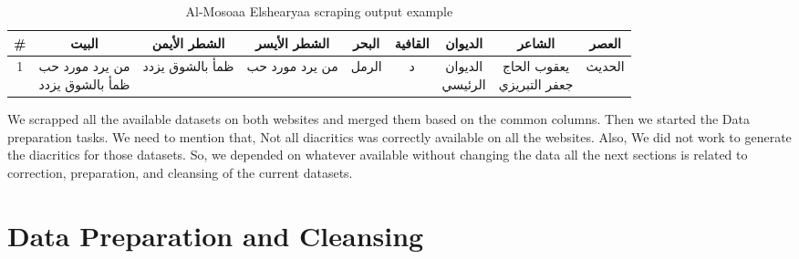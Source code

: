\begin{enumerate}
\begin{table}[H]
	\centering
	\begin{tabular}{c c c c c c c c c}
          \toprule
\small{\textbf{\#}} &
\small{\textbf{\textarabic{البيت}}} &
\small{\textbf{\textarabic{الشطر الأيمن}}}&                        \small{\textbf{\textarabic{الشطر الأيسر}}} &
\small{\textbf{\textarabic{البحر}}}&                                 \small{\textbf{\textarabic{القافية}}}& \small{\textbf{\textarabic{الديوان}}}&                               \small{\textbf{\textarabic{الشاعر}}}&
\small{\textbf{\textarabic{العصر}}}\\
          \midrule
1 &          
\makecell{\textarabic{من يرد مورد حب} \\ \textarabic{ظمأ بالشوق يزدد}} &
\textarabic{ظمأ بالشوق يزدد} &                                                        \textarabic{من يرد مورد حب} &                                                       \textarabic{الرمل}&
\textarabic{د}&
\makecell{\textarabic{الديوان} \\ \textarabic{الرئيسي}}&
\makecell{\textarabic{يعقوب الحاج}\\ \textarabic{ جعفر التبريزي}}&
\textarabic{الحديث}\\
          
		\bottomrule
	\end{tabular}
	\caption{Al-Mosoaa Elshearyaa scraping output example }\label{tables:ElMosoaa_Sample}
\end{table}
\end{enumerate}

We scrapped all the available datasets on both websites and merged them based on the common columns. Then we started the Data preparation tasks. We need to mention that, Not all diacritics was correctly available on all the websites. Also, We did not work to generate the diacritics for those datasets. So, we depended on whatever available without changing the data all the next sections is related to correction, preparation, and cleansing of the current datasets.
\newpage
\section{Data Preparation and Cleansing}\label{sec:data_clens}

